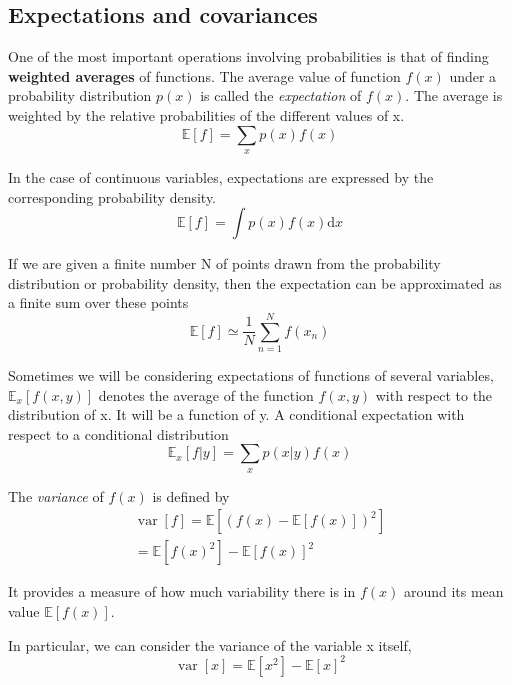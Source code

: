\documentclass[5p,sort&compress]{elsarticle}
\begin{document}
\subsection{Expectations and covariances}

One of the most important operations involving probabilities is that of finding \textbf{weighted averages} of functions. The average value of function $f(x)$ under a probability distribution $p(x)$ is called the \textit{expectation} of $f(x)$. The average is weighted by the relative probabilities of the different values of x.
\begin{equation}
\mathbb{E}[f]=\sum_{x} p(x) f(x)
\end{equation}

In the case of continuous variables, expectations are expressed by the corresponding probability density.
\begin{equation}
\mathbb{E}[f]=\int p(x) f(x) \mathrm{d} x
\end{equation}

If we are given a finite number N of points drawn from the probability distribution or probability density, then the expectation can be approximated as a finite sum over these points
\begin{equation}\label{finite_e}
\mathbb{E}[f] \simeq \frac{1}{N} \sum_{n=1}^{N} f\left(x_{n}\right)
\end{equation}

Sometimes we will be considering expectations of functions of several variables, $\mathbb{E}_{x}[f(x, y)]$ denotes the average of the function $f(x, y)$ with respect to the distribution of x. It will be a function of y. A conditional expectation with respect to a conditional distribution
\begin{equation}
\mathbb{E}_{x}[f | y]=\sum_{x} p(x | y) f(x)
\end{equation}

The \textit{variance} of $f(x)$ is defined by
\begin{equation}
\begin{aligned} \operatorname{var}[f]=\mathbb{E}\left[(f(x)-\mathbb{E}[f(x)])^{2}\right] \\ =\mathbb{E}\left[f(x)^{2}\right]-\mathbb{E}[f(x)]^{2} \end{aligned}
\end{equation}

It provides a measure of how much variability there is in $f(x)$ around its mean value $\mathbb{E}[f(x)]$.

In particular, we can consider the variance of the variable x itself, 
\begin{equation}
\operatorname{var}[x]=\mathbb{E}\left[x^{2}\right]-\mathbb{E}[x]^{2}
\end{equation}
\end{document}
